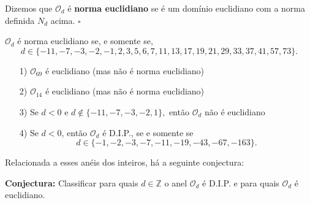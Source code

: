 \documentclass[AlgebraII/algebraII_notes.tex]{subfiles}
\begin{document}
\begin{def*}
	Dizemos que \(\mathcal{O}_{d}\) é \textbf{norma euclidiano} se é um domínio euclidiano com a norma definida \(N_{d}\) acima. \(\square\)
\end{def*}
\begin{theorem*}
	\(\mathcal{O}_{d}\) é norma euclidiano se, e somente se,
	\[
		d\in\{-11, -7, -3, -2, -1, 2, 3, 5, 6, 7, 11, 13, 17, 19, 21, 29, 33, 37, 41, 57, 73\}.
	\]
\end{theorem*}
\begin{theorem*}
	\begin{itemize}
		\item[1)] \(\mathcal{O}_{69}\) é euclidiano (mas não é norma euclidiano)
		\item[2)] \(\mathcal{O}_{14}\) é euclidiano (mas não é norma euclidiano)
		\item[3)] Se \(d < 0\) e \(d\not\in\{-11, -7, -3, -2, 1\},\) então \(\mathcal{O}_{d}\) não é euclidiano
		\item[4)] Se \(d < 0\), então \(\mathcal{O}_{d}\) é D.I.P., se e somente se
		      \[
			      d\in\{-1, -2, -3, -7, -11, -19, -43, -67, -163\}.
		      \]
	\end{itemize}
\end{theorem*}
Relacionada a esses anéis dos inteiros, há a seguinte conjectura:

\textbf{Conjectura:} Classificar para quais \(d\in \mathbb{Z}\) o anel \(\mathcal{O}_{d}\) é D.I.P. e para quais
\(\mathcal{O}_{d}\) é euclidiano.
\end{document}
